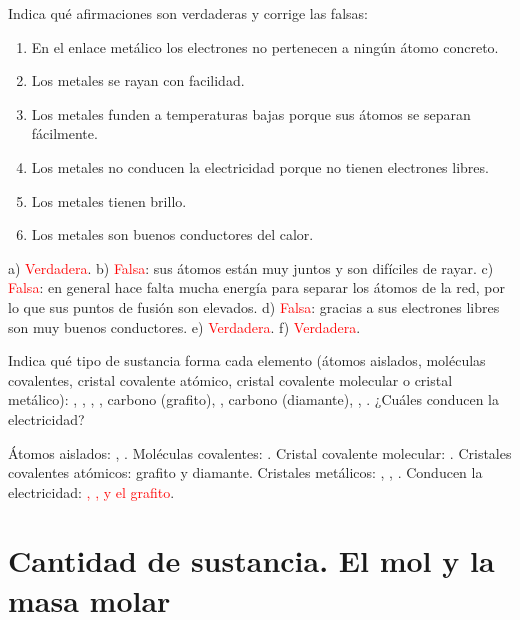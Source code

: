 \begin{exercise}
    Indica qué afirmaciones son verdaderas y corrige las falsas:
    \begin{enumerate}[label=\alph*)]
        \item En el enlace metálico los electrones no pertenecen a ningún átomo concreto.
        \item Los metales se rayan con facilidad.
        \item Los metales funden a temperaturas bajas porque sus átomos se separan fácilmente.
        \item Los metales no conducen la electricidad porque no tienen electrones libres.
        \item Los metales tienen brillo.
        \item Los metales son buenos conductores del calor.
    \end{enumerate}
    \begin{solu}
        a) \textcolor{red}{Verdadera}. b) \textcolor{red}{Falsa}: sus átomos están muy juntos y son difíciles de rayar. c) \textcolor{red}{Falsa}: en general hace falta mucha energía para separar los átomos de la red, por lo que sus puntos de fusión son elevados. d) \textcolor{red}{Falsa}: gracias a sus electrones libres son muy buenos conductores. e) \textcolor{red}{Verdadera}. f) \textcolor{red}{Verdadera}.
    \end{solu}
\end{exercise}

\begin{exercise}
    Indica qué tipo de sustancia forma cada elemento (átomos aislados, moléculas covalentes, cristal covalente atómico, cristal covalente molecular o cristal metálico): , , , , carbono (grafito), , carbono (diamante), , . ¿Cuáles conducen la electricidad?
    \begin{solu}
        Átomos aislados: , . Moléculas covalentes: . Cristal covalente molecular: . Cristales covalentes atómicos: grafito y diamante. Cristales metálicos: , , .
        Conducen la electricidad: \textcolor{red}{, ,  y el grafito}.
    \end{solu}
\end{exercise}

\section{Cantidad de sustancia. El mol y la masa molar}

